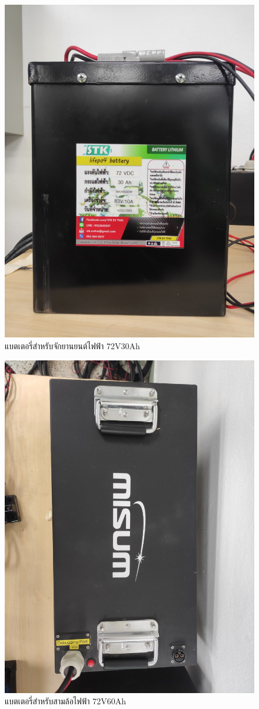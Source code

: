 \begin{center}
	\begin{figure}[H]
		\includegraphics[width=0.5\linewidth]{Chapters/img/Battery_72V30Ah.jpg}
		\centering
		\captionsetup{justification=centering,margin=2cm}
		\caption{แบตเตอรี่สำหรับจักยานยนต์ไฟฟ้า 72V30Ah}
	\end{figure}
	\begin{figure}[H]
		\includegraphics[width=0.5\linewidth]{Chapters/img/Battery_72V60Ah.jpg}
		\centering
		\captionsetup{justification=centering,margin=2cm}
		\caption{แบตเตอรี่สำหรับสามล้อไฟฟ้า 72V60Ah}
	\end{figure}

\end{center}
